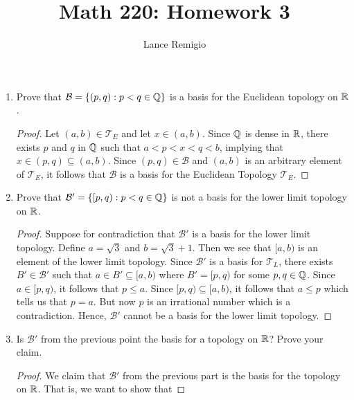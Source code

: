 \documentclass[a4paper]{article}
\title{Math 220: Homework 3}
\author{Lance Remigio}
\begin{document}
\maketitle

\rhead{\thepage}

\begin{problem}
   \begin{enumerate}
       \item[(i)] Prove that \( \mathcal{B} = \{ (p,q) : p < q \in \mathbb{Q}  \}  \) is a basis for the Euclidean topology on \( \mathbb{R}  \).
           \begin{proof}
               Let \( (a,b) \in {\mathcal{T}}_{E}  \) and let \( x \in (a,b) \). Since \( \mathbb{Q}  \) is dense in \( \mathbb{R}  \), there exists \( p \) and \( q  \) in \( \mathbb{Q}  \) such that \( a  < p < x < q < b \), implying that \( x \in (p,q) \subseteq (a,b) \). Since \( (p,q) \in \mathcal{B} \) and \( (a,b) \) is an arbitrary element of \( {\mathcal{T}}_{E} \), it follows that \( \mathcal{B} \) is a basis for the Euclidean Topology \( {\mathcal{T}}_{E} \).   
           \end{proof}
       \item[(ii)] Prove that \( \mathcal{B}' = \{  [p,q) : p < q \in \mathbb{Q}  \}  \) is not a basis for the lower limit topology on \( \mathbb{R}  \).
           \begin{proof}
               Suppose for contradiction that \( \mathcal{B}' \) is a basis for the lower limit topology. Define \( a = \sqrt{ 3 }  \) and \( b = \sqrt{ 3 }  + 1  \). Then we see that \( [a,b) \) is an element of the lower limit topology. Since \( \mathcal{B}' \) is a basis for \( {\mathcal{T}}_{L} \), there exists \( B' \in \mathcal{B}' \) such that \( a \in  B' \subseteq [a,b)  \) where \( B' = [p,q) \) for some \( p,q \in \mathbb{Q}  \). Since \( a \in [p,q) \), it follows that \( p \leq a  \). Since \( [p,q) \subseteq [a,b) \), it follows that \( a \leq p  \) which tells us that \( p = a  \). But now \( p  \) is an irrational number which is a contradiction. Hence, \( \mathcal{B}' \) cannot be a basis for the lower limit topology.     
           \end{proof}
        \item[(iii)] Is \( \mathcal{B}' \) from the previous point the basis for a topology on \( \mathbb{R}  \)? Prove your claim.
            \begin{proof}
            We claim that \( \mathcal{B}'  \) from the previous part is the basis for the topology on \( \mathbb{R}  \). That is, we want to show that 

\end{proof}
\end{enumerate}
\end{problem}
\end{document}
